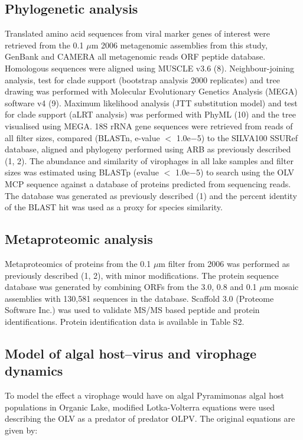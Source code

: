 \subsection{Phylogenetic analysis}
Translated amino acid sequences from viral marker genes of interest were retrieved from the 0.1 $\mu$m 2006 metagenomic assemblies from this study, GenBank and CAMERA all metagenomic reads ORF peptide database. Homologous sequences were aligned using MUSCLE v3.6 (8). 
Neighbour-joining analysis, test for clade support (bootstrap analysis 2000 replicates) and tree drawing was performed with Molecular Evolutionary Genetics Analysis (MEGA) software v4 (9). 
Maximum likelihood analysis (JTT substitution model) and test for clade support (aLRT analysis) was performed with PhyML (10) and the tree visualised using MEGA. 
18S rRNA gene sequences were retrieved from reads of all filter sizes, compared (BLASTn, e-value $<$ 1.0e$-$5) to the SILVA100 SSURef database, aligned and phylogeny performed using ARB as previously described (1, 2). 
The abundance and similarity of virophages in all lake samples and filter sizes was estimated using BLASTp (evalue $<$ 1.0e$-$5) to search using the OLV MCP sequence against a database of proteins predicted from sequencing reads. 
The database was generated as previously described (1) and the percent identity of the BLAST hit was used as a proxy for species similarity. 

\subsection{Metaproteomic analysis}
Metaproteomics of proteins from the 0.1 $\mu$m filter from 2006 was performed as previously described (1, 2), with minor modifications. 
The protein sequence database was generated by combining ORFs from the 3.0, 0.8 and 0.1 $\mu$m mosaic assemblies with 130,581 sequences in the database. 
Scaffold 3.0 (Proteome Software Inc.) was used to validate MS/MS based peptide and protein identifications. 
Protein identification data is available in Table S2. 

\subsection[Algal Host--Virus and Virophage Dynamics]{Model of algal host--virus and virophage dynamics}
To model the effect a virophage would have on algal Pyramimonas algal host populations in Organic Lake, modified Lotka-Volterra equations were used describing the OLV as a predator of predator OLPV. 
The original equations are given by:

